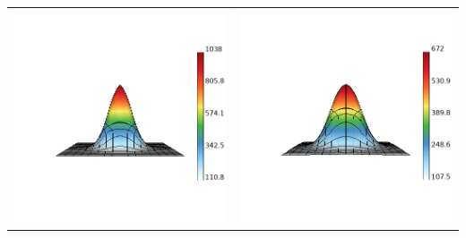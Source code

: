 \documentclass[8pt, compress]{beamer}
\begin{document}
\begin{frame}
\begin{center}
\begin{tabular}{cc}
\\
\includegraphics[width=\fs\textwidth]{../figures/ALE_local_Te_3D_neconst.png}
&
    \includegraphics[width=\fs\textwidth]{../figures/ALE_nonlocal_Te_3D_neconst.png}
\end{tabular}
\end{center}
\end{frame}
\end{document}
